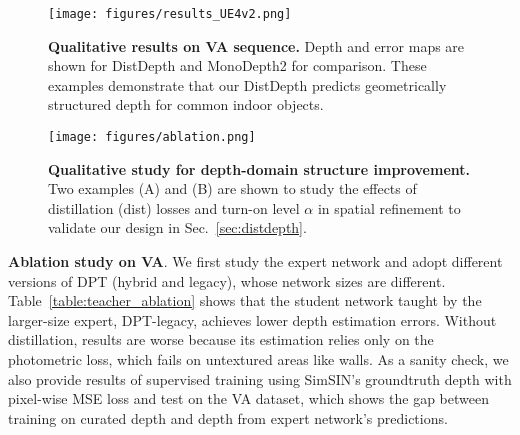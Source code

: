\documentclass[10pt,twocolumn,letterpaper]{article}
\begin{document}
\begin{figure}[bt!]
    \centering
    \texttt{[image: figures/results\_UE4v2.png]}
    \vspace{-1pt}
    \caption{\textbf{Qualitative results on VA sequence.} Depth and error maps are shown for DistDepth and MonoDepth2 for comparison. These examples demonstrate that our DistDepth predicts geometrically structured depth for common indoor objects.}
    \vspace{-15pt}
    \label{results_ue4}
\end{figure}

\begin{figure}[bt!]
    \centering
    \texttt{[image: figures/ablation.png]}
    \vspace{-5pt}
    \caption{\textbf{Qualitative study for depth-domain structure improvement.} Two examples (A) and (B) are shown to study the effects of distillation (dist) losses and turn-on level $\alpha$ in spatial refinement to validate our design in Sec.~\ref{sec:distdepth}.}
    \vspace{-7pt}
    \label{ablation}
\end{figure}

\textbf{Ablation study on VA}. We first study the expert network and adopt different versions of DPT (hybrid and legacy), whose network sizes are different. Table~\ref{table:teacher_ablation} shows that the student network taught by the larger-size expert, DPT-legacy, achieves lower depth estimation errors. Without distillation, results are worse because its estimation relies only on the photometric loss, which fails on untextured areas like walls. As a sanity check, we also provide results of supervised training using SimSIN's groundtruth depth with pixel-wise MSE loss and test on the VA dataset, which shows the gap between training on curated depth and depth from expert network's predictions.
\end{document}
